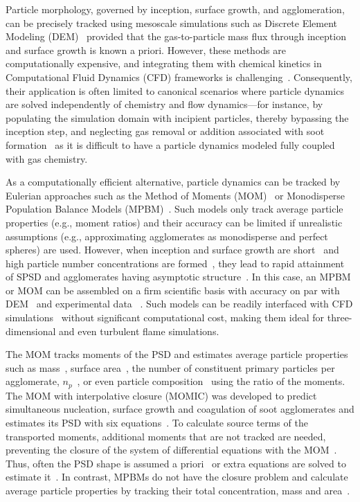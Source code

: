 Particle morphology, governed by inception, surface growth, and agglomeration, can be precisely tracked using mesoscale simulations such as Discrete Element Modeling (DEM)~\citep{Kelesidis2017Flame} provided that the gas-to-particle mass flux through inception and surface growth is known a priori. However, these methods are computationally expensive, and integrating them with chemical kinetics in Computational Fluid Dynamics (CFD) frameworks is challenging~\citep{kelesidis2021perspective}. Consequently, their application is often limited to canonical scenarios where particle dynamics are solved independently of chemistry and flow dynamics—for instance, by populating the simulation domain with incipient particles, thereby bypassing the inception step, and neglecting gas removal or addition associated with soot formation~\citep{Kelesidis2017} as it is difficult to have a particle dynamics modeled fully coupled with gas chemistry. 

As a computationally efficient alternative, particle dynamics can be tracked by Eulerian approaches such as the Method of Moments (MOM)~\citep{kazakov1998dynamic} or Monodisperse Population Balance Models (MPBM)~\citep{kruis1993simple}. Such models only track average particle properties (e.g., moment ratios) and their accuracy can be limited if unrealistic assumptions (e.g., approximating agglomerates as monodisperse and perfect spheres) are used. However, when inception and surface growth are short~\citep{Spicer2002} and high particle number concentrations are formed~\cite{Kelesidis2017}, they lead to rapid attainment of SPSD and agglomerates having asymptotic structure~\citep{Goudeli2016}. In this case, an MPBM or MOM can be assembled on a firm scientific basis with accuracy on par with DEM~\citep{Kelesidis2017Flame} and experimental data ~\citep{abid2008evolution, ma2013soot, camacho2015mobility}. Such models can be readily interfaced with CFD simulations~\citep{grohn2012fluid} without significant computational cost, making them ideal for three-dimensional and even turbulent flame simulations. 

The MOM tracks moments of the PSD and estimates average particle properties such as mass~\citep{pratsinis1988simultaneous}, surface area~\citep{blanquart2009joint}, the number of constituent primary particles per agglomerate, ${n_p}$~\citep{kazakov1998dynamic}, or even particle composition~\citep{blanquart2009analyzing} using the ratio of the moments. The MOM with interpolative closure (MOMIC) was developed to predict simultaneous nucleation, surface growth and coagulation of soot agglomerates and estimates its PSD with six equations~\citep{kazakov1998dynamic}. To calculate source terms of the transported moments, additional moments that are not tracked are needed, preventing the closure of the system of differential equations with the MOM~\citep{pratsinis1988simultaneous, frenklach1987aerosol}. Thus, often the PSD shape is assumed a priori~\citep{pratsinis1988simultaneous} or extra equations are solved to estimate it~\citep{kruis1993simple}. In contrast, MPBMs do not have the closure problem and calculate average particle properties by tracking their total concentration, mass \citep{kruis1993simple} and area~\citep{tsantilis2004soft, lindstedt1994simplified}. 

